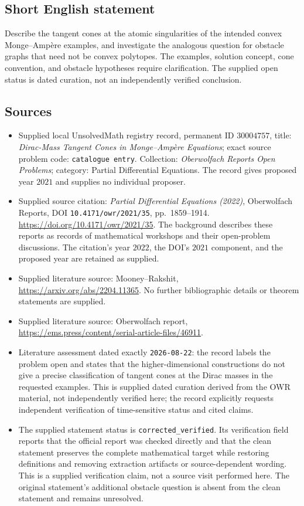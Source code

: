 \documentclass[11pt]{article}
\begin{document}
\subsection{Short English statement}
Describe the tangent cones at the atomic singularities of the intended convex Monge--Amp\`ere examples, and investigate the analogous question for obstacle graphs that need not be convex polytopes. The examples, solution concept, cone convention, and obstacle hypotheses require clarification. The supplied open status is dated curation, not an independently verified conclusion.
\subsection{Sources}
\begin{itemize}
\item Supplied local UnsolvedMath registry record, permanent ID \(30004757\), title: \emph{Dirac-Mass Tangent Cones in Monge--Amp\`ere Equations}; exact source problem code: \texttt{catalogue entry}. Collection: \emph{Oberwolfach Reports Open Problems}; category: Partial Differential Equations. The record gives proposed year \(2021\) and supplies no individual proposer.
\item Supplied source citation: \emph{Partial Differential Equations (2022)}, Oberwolfach Reports, DOI \texttt{10.4171/owr/2021/35}, pp.~1859--1914. \url{https://doi.org/10.4171/owr/2021/35}. The background describes these reports as records of mathematical workshops and their open-problem discussions. The citation's year \(2022\), the DOI's \(2021\) component, and the proposed year are retained as supplied.
\item Supplied literature source: Mooney--Rakshit, \url{https://arxiv.org/abs/2204.11365}. No further bibliographic details or theorem statements are supplied.
\item Supplied literature source: Oberwolfach report, \url{https://ems.press/content/serial-article-files/46911}.
\item Literature assessment dated exactly \texttt{2026-08-22}: the record labels the problem open and states that the higher-dimensional constructions do not give a precise classification of tangent cones at the Dirac masses in the requested examples. This is supplied dated curation derived from the OWR material, not independently verified here; the record explicitly requests independent verification of time-sensitive status and cited claims.
\item The supplied statement status is \texttt{corrected\_verified}. Its verification field reports that the official report was checked directly and that the clean statement preserves the complete mathematical target while restoring definitions and removing extraction artifacts or source-dependent wording. This is a supplied verification claim, not a source visit performed here. The original statement's additional obstacle question is absent from the clean statement and remains unresolved.
\end{itemize}
\end{document}
